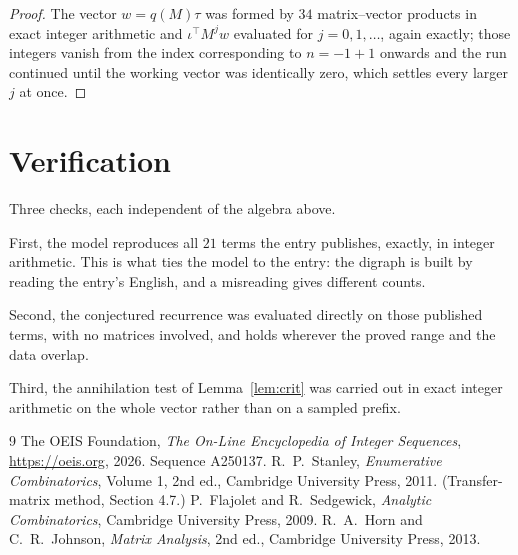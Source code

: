 \documentclass[11pt,a4paper]{article}
\theoremstyle{plain}
\theoremstyle{definition}
\begin{document}
\begin{proof}
The vector $w=q(M)\tau$ was formed by $34$ matrix--vector products in exact integer
arithmetic and $\iota^{\!\top}M^{j}w$ evaluated for $j=0,1,\dots$, again exactly; those
integers vanish from the index corresponding to $n=-1+1$ onwards and the run continued
until the working vector was identically zero, which settles every larger $j$ at once.
\end{proof}

\section{Verification}

Three checks, each independent of the algebra above.

First, the model reproduces all $21$ terms the entry publishes, exactly, in integer
arithmetic. This is what ties the model to the entry: the digraph is built by reading the
entry's English, and a misreading gives different counts.

Second, the conjectured recurrence was evaluated directly on those published terms, with no
matrices involved, and holds wherever the proved range and the data overlap.

Third, the annihilation test of Lemma~\ref{lem:crit} was carried out in exact integer
arithmetic on the whole vector rather than on a sampled prefix.

\begin{thebibliography}{9}
 The OEIS Foundation, \emph{The On-Line Encyclopedia of Integer
Sequences}, \url{https://oeis.org}, 2026. Sequence A250137.
 R.~P.~Stanley, \emph{Enumerative Combinatorics}, Volume 1, 2nd ed.,
Cambridge University Press, 2011. (Transfer-matrix method, Section 4.7.)
 P.~Flajolet and R.~Sedgewick, \emph{Analytic Combinatorics}, Cambridge
University Press, 2009.
 R.~A.~Horn and C.~R.~Johnson, \emph{Matrix Analysis}, 2nd ed., Cambridge
University Press, 2013.
\end{thebibliography}
\end{document}
